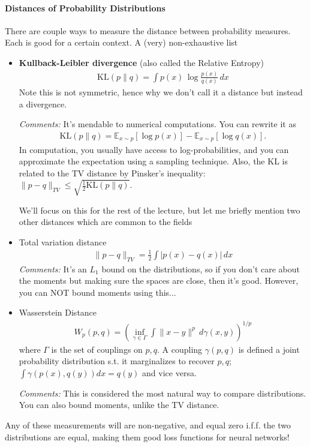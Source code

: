 \paragraph{Distances of Probability Distributions} There are couple ways to measure the distance between probability measures. Each is good for a certain context. A (very) non-exhaustive list
\begin{itemize}
	\item \textbf{Kullback-Leibler divergence} (also called the Relative Entropy)
		\begin{align}
			\text{KL}(p\|q) = \int p(x) \, \log \frac{p(x)}{q(x)} \, dx
		\end{align}
		Note this is not symmetric, hence why we don't call it a distance but instead a divergence.
		
		\emph{Comments:} It's mendable to numerical computations. You can rewrite it as
		\begin{align}
			\text{KL}(p \| q) = \mathbb E_{x\sim p} [\log p(x)] - \mathbb E_{x\sim p}[\log q(x)].
		\end{align}
		In computation, you usually have access to log-probabilities, and you can approximate the expectation using a sampling technique. Also, the KL is related to the TV distance by Pinsker's inequality: $\|p - q\|_{TV} \leq \sqrt{\frac{1}{2} \text{KL}(p \| q)}$. 
		
		We'll focus on this for the rest of the lecture, but let me briefly mention two other distances which are common to the fields
		\item Total variation distance
		\begin{align}
			\| p - q\|_{TV} = \frac{1}{2} \int |p(x) - q(x) | \, dx
		\end{align}
		\emph{Comments:} It's an $L_1$ bound on the distributions, so if you don't care about the moments but making sure the spaces are close, then it's good. However, you can NOT bound moments using this...
		\item Wasserstein Distance
		\begin{align}
			W_p(p,q) = \left(\inf_{\gamma \in \Gamma} \int \| x- y \|^p \, d\gamma(x,y) \right)^{1/p}
		\end{align}
		where $\Gamma$ is the set of couplings on $p,q$. A coupling $\gamma(p,q)$ is defined a joint probability distribution s.t. it marginalizes to recover $p,q$; $\int \gamma(p(x), q(y)) dx = q(y)$ and vice versa.
		
		\emph{Comments:} This is considered the most natural way to compare distributions. You can also bound moments, unlike the TV distance.
\end{itemize}
\begin{fact}
	Any of these measurements will are non-negative, and equal zero i.f.f. the two distributions are equal, making them good loss functions for neural networks!
\end{fact}

